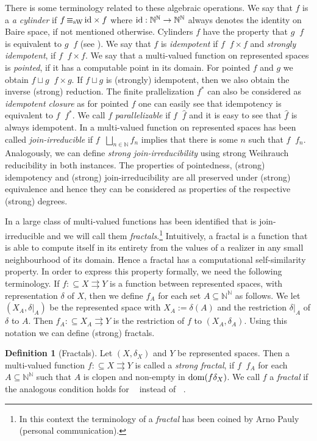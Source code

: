 \documentclass[a4paper]{amsart}
\def\IN{{\mathbb{N}}}
\def\In{\subseteq}
\def\mto{\rightrightarrows}
\def\id{{\rm id}}
\def\dom{{\rm dom}}
\def\Baire{{\IN^\IN}}
\def\leqW{\mathop{\leq_{\mathrm{W}}}}
\def\equivW{\mathop{\equiv_{\mathrm{W}}}}
\def\leqSW{\mathop{\leq_{\mathrm{sW}}}}
\def\equivSW{\mathop{\equiv_{\mathrm{sW}}}}
\theoremstyle{definition}
\newtheorem{definition}[theorem]{Definition}
\begin{document}
There is some terminology related to these algebraic operations. 
We say that $f$ is a {\em a cylinder} if $f\equivSW\id\times f$ where $\id:\Baire\to\Baire$ always
denotes the identity on Baire space, if not mentioned otherwise. 
Cylinders $f$ have the property that $g\leqW f$ is equivalent to $g\leqSW f$ (see \cite{BG11}).
We say that $f$ is {\em idempotent}
if $f\equivW f\times f$ and {\em strongly idempotent}, if $f\equivSW f\times f$. 
We say that a multi-valued function on represented spaces is {\em pointed}, if it has a computable
point in its domain. For pointed $f$ and $g$ we obtain $f\sqcup g\leqSW f\times g$. 
If $f\sqcup g$ is (strongly) idempotent, then we also obtain the inverse (strong) reduction. 
The finite prallelization $f^*$ can also be considered as {\em idempotent closure} as for pointed $f$ one
can easily see that idempotency is equivalent to $f\equivW f^*$.
We call $f$ {\em parallelizable} if $f\equivW\widehat{f}$ and it is easy to see that $\widehat{f}$ is always idempotent.
In \cite{BBP} a multi-valued function on represented spaces has been called 
{\em join-irreducible} if $f\equivW\bigsqcup_{n\in\IN}f_n$ implies that there
is some $n$ such that $f\equivW f_n$. Analogously, we can define {\em strong join-irreducibility}
using strong Weihrauch reducibility in both instances. 
The properties of pointedness, (strong) idempotency and (strong) join-irreducibility are all preserved under
(strong) equivalence and hence they can be considered as properties of the respective (strong) degrees.

In \cite{BBP} a large class of multi-valued functions has been identified that is join-irreducible 
and we will call them {\em fractals}.\footnote{In this context the terminology of a {\em fractal} 
has been coined by Arno Pauly (personal communication).}
Intuitively, a fractal is a function that is able to compute itself in its entirety from the values 
of a realizer in any small neighbourhood of its domain. Hence a fractal has a computational self-similarity property.
In order to express this property formally, we need the following terminology. 
If $f:\In X\mto Y$ is a function between represented spaces, with representation
$\delta$ of $X$, then we define
$f_A$ for each set $A\In\Baire$ as follows. We let $(X_A,\delta|_A)$ be
the represented space with $X_A:=\delta(A)$ and the restriction $\delta|_A$
of $\delta$ to $A$. Then $f_A:\In X_A\mto Y$ is the restriction of $f$ to $(X_A,\delta_A)$.
Using this notation we can define (strong) fractals.

\begin{definition}[Fractals]
Let $(X,\delta_X)$ and $Y$ be represented spaces. Then a multi-valued function $f:\In X\mto Y$
is called a {\em strong fractal}, if $f\leqSW f_A$ for each $A\In\Baire$ such that
$A$ is clopen and non-empty in $\dom(f\delta_X)$.
We call $f$ a {\em fractal} if the analogous condition holds for $\leqW$ instead of $\leqSW$.
\end{definition}
\end{document}

